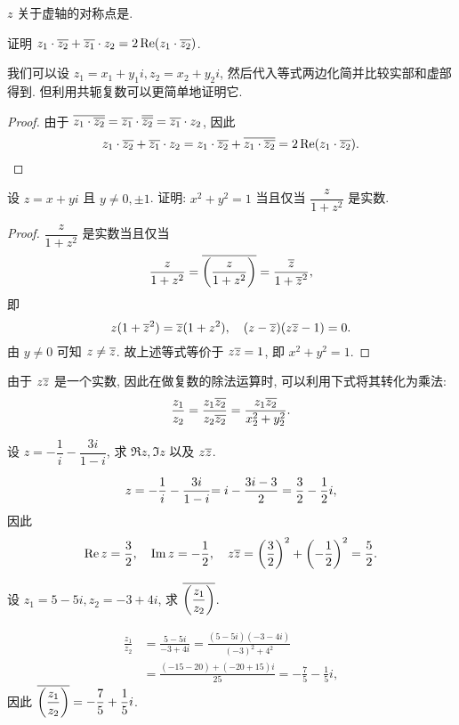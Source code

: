 \begin{exercise}
  $z$ 关于虚轴的对称点是\fillblank{}.
\end{exercise}
\begin{example}
  证明 $z_1\cdot\overline{z_2}+\overline{z_1}\cdot z_2=2\operatorname{Re}(z_1\cdot\overline{z_2})$.
\end{example}

我们可以设 $z_1=x_1+y_1i,z_2=x_2+y_2i$, 然后代入等式两边化简并比较实部和虚部得到.
但利用共轭复数可以更简单地证明它.

\begin{proof}
  由于 $\overline{z_1\cdot\overline{z_2}}=\overline{z_1}\cdot\overline{\overline{z_2}}=\overline{z_1}\cdot z_2$, 因此
    \[z_1\cdot\overline{z_2}+\overline{z_1}\cdot z_2
      =z_1\cdot\overline{z_2}+\overline{z_1\cdot\overline{z_2}}
      =2\operatorname{Re}(z_1\cdot\overline{z_2}).\qedhere\]
\end{proof}

\begin{example}
  设 $z=x+yi$ 且 $y\neq 0,\pm1$. 证明: $x^2+y^2=1$ 当且仅当 $\dfrac z{1+z^2}$ 是实数.
\end{example}
\begin{proof}
  $\dfrac z{1+z^2}$ 是实数当且仅当
    \[\frac z{1+z^2}=\overline{\left(\frac z{1+z^2}\right)}=\frac{\overline z}{1+{\overline z}^2},\]
  即
    \[z(1+{\overline z}^2)=\overline z(1+z^2),\quad (z-\overline z)(z\overline z-1)=0.\]%
  由 $y\neq0$ 可知 $z\neq \overline z$.
  故上述等式等价于 $z\overline z=1$, 即 $x^2+y^2=1$.
\end{proof}

由于 $z\overline z$ 是一个实数,
因此在做复数的除法运算时, 可以利用下式将其转化为乘法:
  \[\dfrac{z_1}{z_2}=\dfrac{z_1\overline{z_2}}{z_2\overline{z_2}}=\dfrac{z_1\overline{z_2}}{x_2^2+y_2^2}.\]
\begin{example}
  设 $z=-\dfrac1i-\dfrac{3i}{1-i}$, 求 $\Re z,\Im z$ 以及 $z\overline z$.
\end{example}
\begin{solution}
  \[z=-\frac1i-\frac{3i}{1-i}
  {=i-\frac{3i-3}2=\frac32-\frac{1}{2} i,}\]
  因此
    \[\operatorname{Re} z=\frac32,\quad\operatorname{Im} z=-\frac{1}{2} ,\quad
    z\overline z=\left(\frac32\right)^2+\left(-\frac{1}{2}\right)^2=\frac52.\]
\end{solution}

\begin{example}
  设 $z_1=5-5i,z_2=-3+4i$, 求 $\overline{\left(\dfrac{z_1}{z_2}\right)}$.
\end{example}
\begin{solution}
  \begin{align*}
    \frac{z_1}{z_2}&=\frac{5-5i}{-3+4i}
    =\frac{(5-5i)(-3-4i)}{(-3)^2+4^2}\\
    &=\frac{(-15-20)+(-20+15)i}{25}=-\frac75-\frac15i,
  \end{align*}
  因此 $\overline{\left(\dfrac{z_1}{z_2}\right)}=-\dfrac75+\dfrac15i$.
\end{solution}


